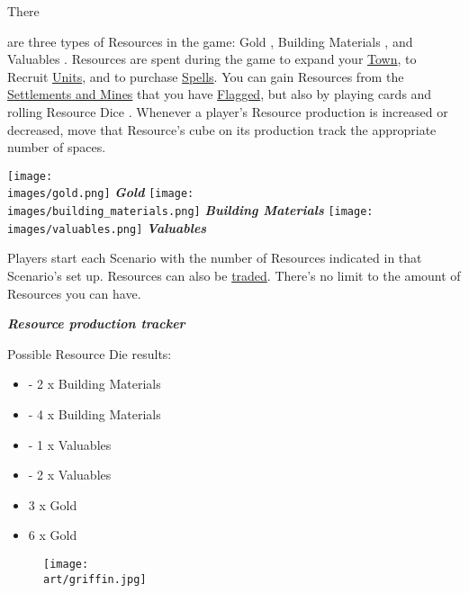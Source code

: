 
\begin{multicols}{2}

\hypertarget{Resources}{There} are three types of Resources in the game: Gold , Building Materials , and Valuables .
Resources are spent during the game to expand your \hyperlink{Town}{Town}, to Recruit \hyperlink{Units}{Units}, and to purchase \hyperlink{spells}{Spells}.
You can gain Resources from the \hyperlink{Mines}{Settlements and Mines} that you have \hyperlink{Categories}{Flagged}, but also by playing cards and rolling Resource Dice .
Whenever a player's Resource production is increased or decreased, move that Resource's cube on its production track the appropriate number of spaces.\par
\begin{multicols}{3}
  \centering
  \vspace*{\fill}
  \texttt{[image: \\images/gold.png]}
  \footnotesize\textcolor{darkcandyapplered}{\textit{\textbf{Gold}}}
  \columnbreak
  \vspace*{\fill}
  \texttt{[image: \\images/building\_materials.png]}
  \footnotesize\textcolor{darkcandyapplered}{\textit{\textbf{Building Materials}}}
  \columnbreak
  \vspace*{\fill}
  \texttt{[image: \\images/valuables.png]}
  \footnotesize\textcolor{darkcandyapplered}{\textit{\textbf{Valuables}}}
\end{multicols}
Players start each Scenario with the number of Resources indicated in that Scenario’s set up.
Resources can also be \hyperlink{Trading}{traded}.
There's no limit to the amount of Resources you can have.

\vspace*{\fill}

\columnbreak

\smallskip
\centering\footnotesize\textcolor{darkcandyapplered}{\textbf{\textit{Resource production tracker}}}
\bigskip

Possible Resource Die  results:
\medskip
\begin{itemize}
  \setlength\itemsep{8pt}
  \item  - 2 x Building Materials
  \item  - 4 x Building Materials
  \item  - 1 x Valuables
  \item  - 2 x Valuables
  \item  3 x Gold
  \item  6 x Gold
\end{itemize}

\end{multicols}

\vspace*{\fill}

\begin{figure*}[!hb]
  \centering
  \texttt{[image: \\art/griffin.jpg]}
\end{figure*}
